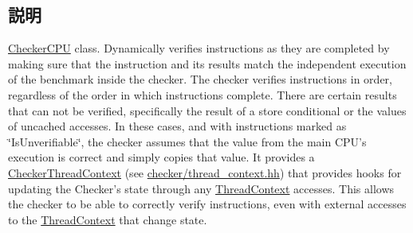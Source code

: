 \subsection{説明}
\hyperlink{classCheckerCPU}{CheckerCPU} class. Dynamically verifies instructions as they are completed by making sure that the instruction and its results match the independent execution of the benchmark inside the checker. The checker verifies instructions in order, regardless of the order in which instructions complete. There are certain results that can not be verified, specifically the result of a store conditional or the values of uncached accesses. In these cases, and with instructions marked as \char`\"{}IsUnverifiable\char`\"{}, the checker assumes that the value from the main CPU's execution is correct and simply copies that value. It provides a \hyperlink{classCheckerThreadContext}{CheckerThreadContext} (see \hyperlink{checker_2thread__context_8hh}{checker/thread\_\-context.hh}) that provides hooks for updating the Checker's state through any \hyperlink{classThreadContext}{ThreadContext} accesses. This allows the checker to be able to correctly verify instructions, even with external accesses to the \hyperlink{classThreadContext}{ThreadContext} that change state. 

